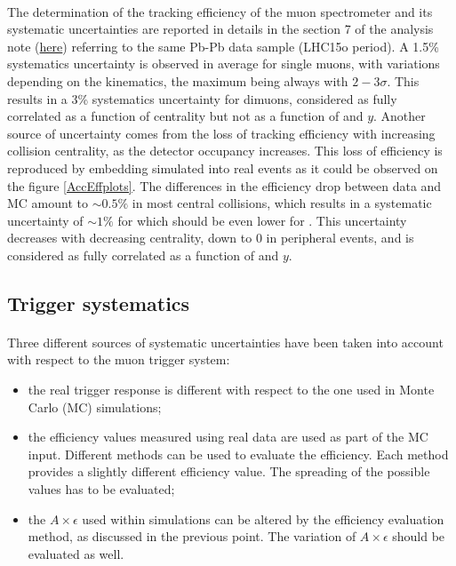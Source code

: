 \paragraph{}
The determination of the tracking efficiency of the muon spectrometer and its systematic uncertainties are reported in details in the section 7 of the \jpsi analysis note (\href{https://aliceinfo.cern.ch/Notes/node/486}{here}) referring to the same Pb-Pb data sample (LHC15o period).
A 1.5\% systematics uncertainty is observed in average for single muons, with variations depending on the kinematics, the maximum being always with $2-3\sigma$.
This results in a 3\% systematics uncertainty for dimuons, considered as fully correlated as a function of centrality but not as a function of \pt and $y$.
Another source of uncertainty comes from the loss of tracking efficiency with increasing collision centrality, as the detector occupancy increases. 
This loss of efficiency is reproduced by embedding simulated \ups into real events as it could be observed on the figure \ref{AccEffplots}.
The differences in the efficiency drop between data and MC amount to $\sim0.5\%$ in most central collisions,
which results in a systematic uncertainty of $\sim1\%$ for \jpsi which should be even lower for \ups.
This uncertainty decreases with decreasing centrality, down to 0 in peripheral events, and is considered as fully correlated as a function of \pt and $y$.







\subsection{Trigger systematics} \label{systTrigger}

\paragraph{}
Three different sources of systematic uncertainties have been taken into account with respect to the muon trigger system:

\begin{itemize}
  \item the real trigger response is different with respect to the one used in Monte Carlo (MC) simulations;
  \item the efficiency values measured using real data are used as part of the MC input. Different methods can be used to evaluate the efficiency. Each method provides a slightly different efficiency value. The spreading of the possible values has to be evaluated;
  \item the $A\times\epsilon$ used within simulations can be altered by the efficiency evaluation method, as discussed in the previous point. The variation of $A\times\epsilon$ should be evaluated as well.
\end{itemize}

